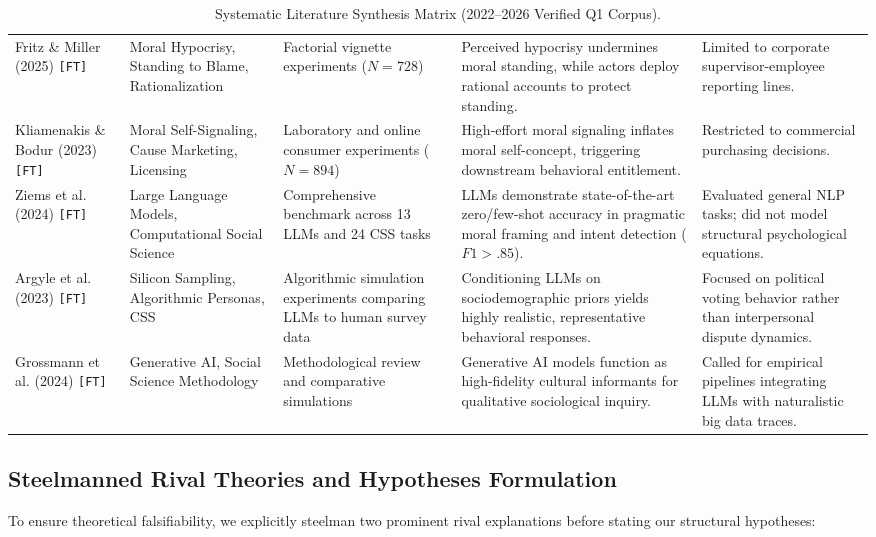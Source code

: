 \begin{table}[htbp]
\begin{tabularx}{\textwidth}{p{2.8cm}p{2.6cm}p{3.2cm}p{4.2cm}p{2.8cm}}
\addlinespace
Fritz \& Miller (2025) \citep{fritz2025putting} \texttt{[FT]} & Moral Hypocrisy, Standing to Blame, Rationalization & Factorial vignette experiments ($N=728$) & Perceived hypocrisy undermines moral standing, while actors deploy rational accounts to protect standing. & Limited to corporate supervisor-employee reporting lines. \\
\addlinespace
Kliamenakis \& Bodur (2023) \citep{kliamenakis2023moral} \texttt{[FT]} & Moral Self-Signaling, Cause Marketing, Licensing & Laboratory and online consumer experiments ($N=894$) & High-effort moral signaling inflates moral self-concept, triggering downstream behavioral entitlement. & Restricted to commercial purchasing decisions. \\
\addlinespace
Ziems et al. (2024) \citep{ziems2024large} \texttt{[FT]} & Large Language Models, Computational Social Science & Comprehensive benchmark across 13 LLMs and 24 CSS tasks & LLMs demonstrate state-of-the-art zero/few-shot accuracy in pragmatic moral framing and intent detection ($F1 > .85$). & Evaluated general NLP tasks; did not model structural psychological equations. \\
\addlinespace
Argyle et al. (2023) \citep{argyle2023out} \texttt{[FT]} & Silicon Sampling, Algorithmic Personas, CSS & Algorithmic simulation experiments comparing LLMs to human survey data & Conditioning LLMs on sociodemographic priors yields highly realistic, representative behavioral responses. & Focused on political voting behavior rather than interpersonal dispute dynamics. \\
\addlinespace
Grossmann et al. (2024) \citep{grossmann2024generative} \texttt{[FT]} & Generative AI, Social Science Methodology & Methodological review and comparative simulations & Generative AI models function as high-fidelity cultural informants for qualitative sociological inquiry. & Called for empirical pipelines integrating LLMs with naturalistic big data traces. \\
\bottomrule
\end{tabularx}
\caption{Systematic Literature Synthesis Matrix (2022--2026 Verified Q1 Corpus).}
\label{tab:synthesis_matrix}
\end{table}

\subsection{Steelmanned Rival Theories and Hypotheses Formulation}
To ensure theoretical falsifiability, we explicitly steelman two prominent rival explanations before stating our structural hypotheses:

